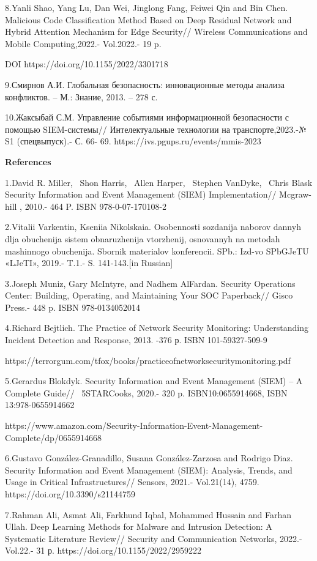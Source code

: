 8.Yanli Shao, Yang Lu, Dan Wei, Jinglong Fang, Feiwei Qin and Bin Chen.
Malicious Code Classification Method Based on Deep Residual Network and
Hybrid Attention Mechanism for Edge Security// Wireless Communications
and Mobile Computing,2022.- Vol.2022.- 19 p.

DOI https://doi.org/10.1155/2022/3301718

9.Смирнов А.И. Глобальная безопасность: инновационные методы анализа
конфликтов. -- М.: Знание, 2013. -- 278 с.

10.Жаксыбай С.М. Управление событиями информационной безопасности с
помощью SIEM-системы// Интелектуальные технологии на транспорте,2023.-№
S1 (спецвыпуск).- С. 66- 69. https://ivs.pgups.ru/events/mmis-2023

\textbf{References}

1.David R. Miller,~ Shon Harris,~ Allen Harper,~ Stephen VanDyke,~ Chris
Blask Security Information and Event Management (SIEM) Implementation//
Mcgraw-hill , 2010.- 464 P. ISBN 978-0-07-170108-2

2.Vitalii Varkentin, Kseniia Nikolskaia. Osobennosti sozdanija naborov
dannyh dlja obuchenija sistem obnaruzhenija vtorzhenij, osnovannyh na
metodah mashinnogo obuchenija. Sbornik materialov konferencii. SPb.:
Izd-vo SPbGJeTU «LJeTI», 2019.- T.1.- S. 141-143.{[}in Russian{]}

3.Joseph Muniz, Gary McIntyre, and Nadhem AlFardan. Security Operations
Center: Building, Operating, and Maintaining Your SOC Paperback// Gisco
Press.- 448 p. ISBN 978-0134052014

4.Richard Bejtlich. The Practice of Network Security Monitoring:
Understanding Incident Detection and Response, 2013. -376 р. ISBN
101-59327-509-9

https://terrorgum.com/tfox/books/practiceofnetworksecuritymonitoring.pdf

5.Gerardus Blokdyk. Security Information and Event Management (SIEM) --
A Complete Guide// ~5STARCooks, 2020.- 320 p. ISBN10:0655914668, ISBN
13:978-0655914662

https://www.amazon.com/Security-Information-Event-Management-Complete/dp/0655914668

6.Gustavo González-Granadillo, Susana González-Zarzosa and Rodrigo Diaz.
Security Information and Event Management (SIEM): Analysis, Trends, and
Usage in Critical Infrastructures// Sensors, 2021.- Vol.21(14), 4759.
https://doi.org/10.3390/s21144759

7.Rahman Ali, Asmat Ali, Farkhund Iqbal, Mohammed Hussain and Farhan
Ullah. Deep Learning Methods for Malware and Intrusion Detection: A
Systematic Literature Review// Security and Communication Networks,
2022.- Vol.22.- 31 р. https://doi.org/10.1155/2022/2959222

